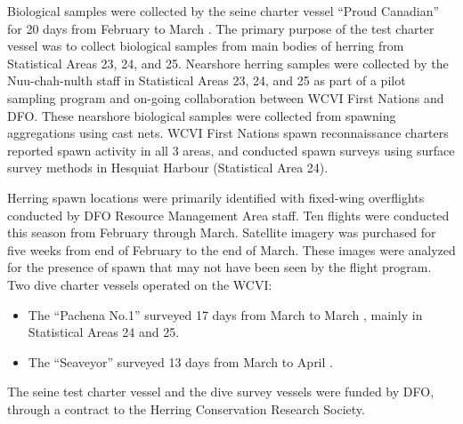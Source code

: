 Biological samples were collected by the seine charter vessel ``Proud Canadian'' for 20 days from February  to March .
The primary purpose of the test charter vessel was to collect biological samples from main bodies of herring from Statistical Areas 23, 24, and 25.
Nearshore herring samples were collected by the Nuu-chah-nulth staff in Statistical Areas 23, 24, and 25 as part of a pilot sampling program and on-going collaboration between WCVI First Nations and DFO.
These nearshore biological samples were collected from spawning aggregations using cast nets.
WCVI First Nations spawn reconnaissance charters reported spawn activity in all 3 areas, and conducted spawn surveys using surface survey methods in Hesquiat Harbour (Statistical Area 24).

Herring spawn locations were primarily identified with fixed-wing overflights conducted by DFO Resource Management Area staff.
Ten flights were conducted this season from February through March.
Satellite imagery was purchased for five weeks from end of February to the end of March.
These images were analyzed for the presence of spawn that may not have been seen by the flight program. 
Two dive charter vessels operated on the WCVI:
\begin{itemize}
\item The ``Pachena No.1'' surveyed 17 days from March  to March , mainly in Statistical Areas 24 and 25.
\item The ``Seaveyor'' surveyed 13 days from March  to April .
\end{itemize}
The seine test charter vessel and the dive survey vessels were funded by DFO, through a contract to the Herring Conservation Research Society.
